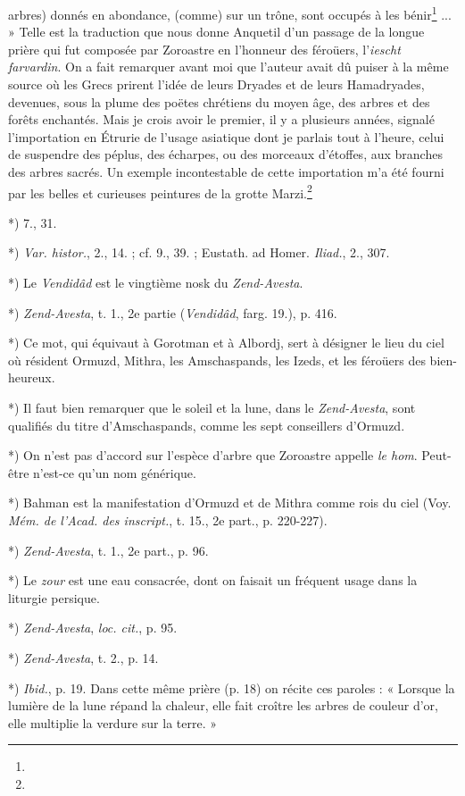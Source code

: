 \documentclass[a4paper, 11pt, oneside, polutonikogreek, french]{article}
\begin{document}
arbres) donnés en abondance, (comme) sur un trône, sont occupés à les bénir\footnote{} ... » Telle est la traduction que nous donne Anquetil d'un passage de la longue prière qui fut composée par Zoroastre en l'honneur des féroüers, l'\emph{iescht farvardin}. On a fait remarquer avant moi que l'auteur avait dû puiser à la même source où les Grecs prirent l'idée de leurs Dryades et de leurs Hamadryades, devenues, sous la plume des poëtes chrétiens du moyen âge, des arbres et des forêts enchantés. Mais je crois avoir le premier, il y a plusieurs années, signalé l'importation en Étrurie de l'usage asiatique dont je parlais tout à l'heure, celui de suspendre des péplus, des écharpes, ou des morceaux d'étoffes, aux branches des arbres sacrés. Un exemple incontestable de cette importation m'a été fourni par les belles et curieuses peintures de la grotte Marzi.\footnote{}

*) 7., 31.

*) \emph{Var. histor.}, 2., 14. ; cf. 9., 39. ; Eustath. ad Homer. \emph{Iliad.}, 2., 307.

*) Le \emph{Vendidâd} est le vingtième nosk du \emph{Zend-Avesta}.

*) \emph{Zend-Avesta}, t. 1., 2e partie (\emph{Vendidâd}, farg. 19.), p. 416.

*) Ce mot, qui équivaut à Gorotman et à Albordj, sert à désigner le lieu du ciel où résident Ormuzd, Mithra, les Amschaspands, les Izeds, et les féroüers des bien-heureux.

*) Il faut bien remarquer que le soleil et la lune, dans le \emph{Zend-Avesta}, sont qualifiés du titre d'Amschaspands, comme les sept conseillers d'Ormuzd.

*) On n'est pas d'accord sur l'espèce d'arbre que Zoroastre appelle \emph{le hom}. Peut-être n'est-ce qu'un nom générique.

*) Bahman est la manifestation d'Ormuzd et de Mithra comme rois du ciel (Voy. \emph{Mém. de l'Acad. des inscript.}, t. 15., 2e part., p. 220-227).

*) \emph{Zend-Avesta}, t. 1., 2e part., p. 96.

*) Le \emph{zour} est une eau consacrée, dont on faisait un fréquent usage dans la liturgie persique.

*) \emph{Zend-Avesta}, \emph{loc. cit.}, p. 95.

*) \emph{Zend-Avesta}, t. 2., p. 14.

*) \emph{Ibid.}, p. 19. Dans cette même prière (p. 18) on récite ces paroles : « Lorsque la lumière de la lune répand la chaleur, elle fait croître les arbres de couleur d'or, elle multiplie la verdure sur la terre. »
\end{document}
